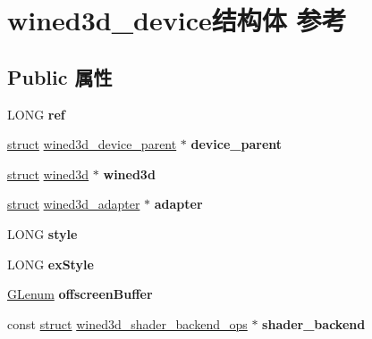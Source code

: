 \hypertarget{structwined3d__device}{}\section{wined3d\+\_\+device结构体 参考}
\label{structwined3d__device}
\subsection*{Public 属性}
\begin{DoxyCompactItemize}
\item 
\mbox{\label{structwined3d__device_a2b3831770d093447f41389c4e03249cb}} 
L\+O\+NG {\bfseries ref}
\item 
\mbox{\label{structwined3d__device_a1b1b7befa6149c931680256117c29f2a}} 
\hyperlink{interfacestruct}{struct} \hyperlink{structwined3d__device__parent}{wined3d\+\_\+device\+\_\+parent} $\ast$ {\bfseries device\+\_\+parent}
\item 
\mbox{\label{structwined3d__device_a56bd81ffdfacdebbc1cdcb19775fdb30}} 
\hyperlink{interfacestruct}{struct} \hyperlink{structwined3d}{wined3d} $\ast$ {\bfseries wined3d}
\item 
\mbox{\label{structwined3d__device_aef6cec87f7a784f21279f8557d8055b9}} 
\hyperlink{interfacestruct}{struct} \hyperlink{structwined3d__adapter}{wined3d\+\_\+adapter} $\ast$ {\bfseries adapter}
\item 
\mbox{\label{structwined3d__device_acde3470216c845514b7ec7c7bcad4397}} 
L\+O\+NG {\bfseries style}
\item 
\mbox{\label{structwined3d__device_a3a5ccdf946e806424cc6ec38f224a9cf}} 
L\+O\+NG {\bfseries ex\+Style}
\item 
\mbox{\label{structwined3d__device_a66d1a057a45e799bba8b78562b39b964}} 
\hyperlink{interfacevoid}{G\+Lenum} {\bfseries offscreen\+Buffer}
\item 
\mbox{\label{structwined3d__device_a428a13a79359fbbdc87d912adf96b3de}} 
const \hyperlink{interfacestruct}{struct} \hyperlink{structwined3d__shader__backend__ops}{wined3d\+\_\+shader\+\_\+backend\+\_\+ops} $\ast$ {\bfseries shader\+\_\+backend}

\end{DoxyCompactItemize}
